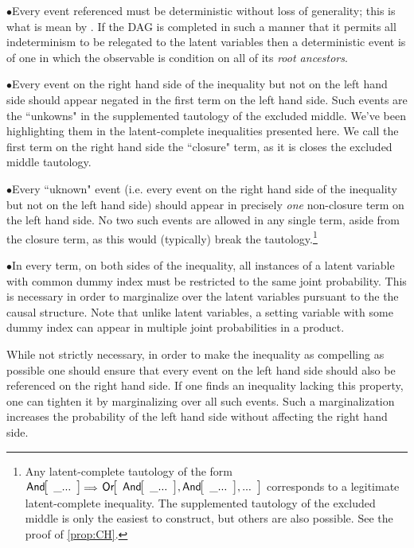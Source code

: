 
\noindent$\bullet$\indent Every event referenced must be deterministic without loss of generality; this is what is mean by . If the DAG is completed in such a manner that it permits all indeterminism to be relegated to the latent variables then a deterministic event is of one in which the observable is condition on all of its \emph{root ancestors}.

\noindent$\bullet$\indent Every event on the right hand side of the inequality but not on the left hand side should appear negated in the first term on the left hand side. Such events are the ``unkowns" in the supplemented tautology of the excluded middle. We've been highlighting them in the latent-complete inequalities presented here. We call the first term on the right hand side the ``closure" term, as it is closes the excluded middle tautology.

\noindent$\bullet$\indent Every ``uknown" event (i.e. every event on the right hand side of the inequality but not on the left hand side) should appear in precisely \emph{one} non-closure term on the left hand side. No two such events are allowed in any single term, aside from the closure term, as this would (typically) break the tautology.\footnote{Any latent-complete tautology of the form $\NamedFunction{And}{\_...}\cramp{\scriptstyle\implies}\NamedFunction{Or}{\NamedFunction{And}{\_...},\NamedFunction{And}{\_...},...}$ corresponds to a legitimate latent-complete inequality. The supplemented tautology of the excluded middle is only the easiest to construct, but others are also possible. See the proof of \cref{prop:CH}.}

\noindent$\bullet$\indent In every term, on both sides of the inequality, all instances of a latent variable with common dummy index must be restricted to the same joint probability. This is necessary in order to marginalize over the latent variables pursuant to the the causal structure. Note that unlike latent variables, a setting variable with some dummy index can appear in multiple joint probabilities in a product.

While not strictly necessary, in order to make the inequality as compelling as possible one should ensure that every event on the left hand side should also be referenced on the right hand side. If one finds an inequality lacking this property, one can tighten it by marginalizing over all such events. Such a marginalization increases the probability of the left hand side without affecting the right hand side.

